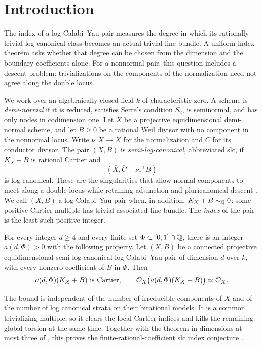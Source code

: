 \section{Introduction}\label{sec:introduction}

The index of a log Calabi--Yau pair measures the degree in which its
rationally trivial log canonical class becomes an actual trivial line
bundle. A uniform index theorem asks whether that degree can be chosen from
the dimension and the boundary coefficients alone. For a nonnormal pair,
this question includes a descent problem: trivializations on the components
of the normalization need not agree along the double locus.

We work over an algebraically closed field $k$ of characteristic zero.
A scheme is \emph{demi-normal} if it is reduced, satisfies Serre's condition
$S_2$, is seminormal, and has only nodes in codimension one. Let $X$ be a
projective equidimensional demi-normal scheme, and let $B\ge0$ be a rational
Weil divisor with no component in the nonnormal locus. Write
$\nu:\bar X\to X$ for the normalization and $\bar C$ for its conductor
divisor. The pair $(X,B)$ is \emph{semi-log-canonical}, abbreviated slc,
if $K_X+B$ is rational Cartier and
\[
                 (\bar X,\bar C+\nu_*^{-1}B)
\]
is log canonical. These are the singularities that allow normal components
to meet along a double locus while retaining adjunction and pluricanonical
descent \citep{Kollar2013}.
We call $(X,B)$ a log Calabi--Yau pair when, in addition,
$K_X+B\sim_{\mathbb Q}0$: some positive Cartier multiple has trivial associated
line bundle. The \emph{index} of the pair is the least such positive
integer.

\begin{theorem}\label{thm:main}
For every integer $d\ge4$ and every finite set
$\Phi\subset[0,1]\cap\mathbb Q$, there is an integer $a(d,\Phi)>0$ with the
following property. Let $(X,B)$ be a connected projective equidimensional
semi-log-canonical log Calabi--Yau pair of dimension $d$ over $k$, with
every nonzero coefficient of $B$ in $\Phi$. Then
\[
            a(d,\Phi)(K_X+B)\text{ is Cartier},
       \qquad \mathcal O_X\bigl(a(d,\Phi)(K_X+B)\bigr)\simeq\mathcal O_X.
\]
\end{theorem}

The bound is independent of the number of irreducible components of $X$
and of the number of log canonical strata on their birational models.
It is a common trivializing multiple, so it clears the local Cartier
indices and kills the remaining global torsion at the same time.
Together with the theorem in dimensions at most three of
\citet[Corollary~1.6]{JiangLiu}, this proves the finite-rational-coefficient
slc index conjecture \citep[Conjecture~1.5]{JiangLiu}.

